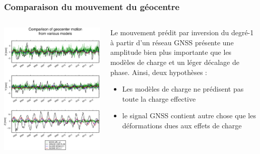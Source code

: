 \documentclass[9pt]{beamer}
\begin{document}
\begin{frame}
\frametitle{Comparaison du mouvement du géocentre}
\begin{columns}
        \begin{column}{0.6\textwidth}
             \includegraphics[height=0.8\textheight]{figures/comparison_geocenter_motion.png}   
        \end{column}
        \begin{column}{0.4\textwidth}
            Le mouvement prédit par inversion du degré-1 à partir d'un réseau GNSS présente une amplitude bien plus importante que les modèles de charge et un léger décalage de phase. Ainsi, deux hypothèses :
\begin{itemize}
    \item Les modèles de charge ne prédisent pas toute la charge effective
    \item le signal GNSS contient autre chose que les déformations dues aux effets de charge
\end{itemize}
        \end{column}
\end{columns}



\end{frame}
\end{document}
